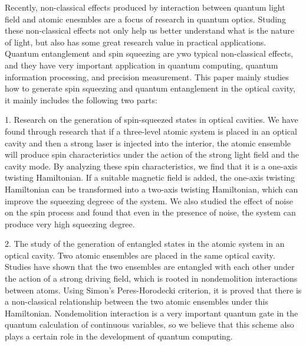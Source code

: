 {
	\par
	\linespread{1.5}\selectfont
	
	 Recently, non-classical effects produced by interaction between quantum light field and atomic enesmbles are a focus of research in quantum optics. Studing these non-classical effects not only help us better understand what is the nature of light, but also has some great research value in practical applications. Quantum entanglement and spin squeezing are ywo typical non-classical effects, and they have very important application in quantum computing, quantum information processing, and precision measurement. This paper mainly studies how to generate spin squeezing and quantum entanglement in the optical cavity, it mainly includes the following two parts:
	 
	 1. Research on the generation of spin-squeezed states in optical cavities. We have found through   research that if a three-level atomic system is placed in an optical cavity and then a strong laser is injected into the interior, the atomic ensemble will produce spin characteristics under the action of the strong light field and the cavity mode. By analyzing these spin characteristics, we find that it is a one-axis twisting Hamiltonian. If a suitable magnetic field is added, the one-axis twisting Hamiltonian can be transformed into a two-axis twisting Hamiltonian, which can improve the squeezing degreec of the system. We also studied the effect of noise on the spin process and found that even in the presence of noise, the system can produce very high squeezing degree.

	  
	2. The study of the generation of entangled states in the atomic system in an optical cavity. Two atomic ensembles are placed in the same optical cavity. Studies have shown that the two ensembles are entangled with each other under the action of a strong driving field, which is rooted in  nondemolition interactions between atoms. Using Simon's Peres-Horodecki criterion, it is proved that there is a non-classical relationship between the two atomic ensembles under this Hamiltonian. Nondemolition interaction is a very important quantum gate in the quantum calculation of continuous variables, so we believe that this scheme also plays a certain role in the development of quantum computing.
	
	\par

\vbox{}
}
